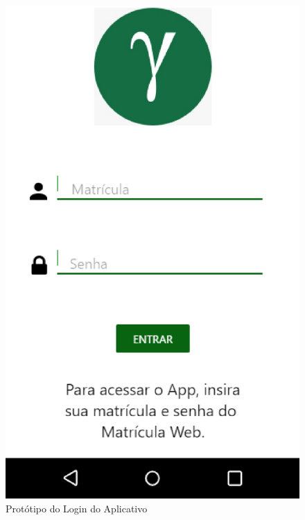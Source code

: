 \begin{figure}[!ht]
  \centering
  \includegraphics[keepaspectratio=true,scale=0.6]{figuras/prot-0.eps}
  \caption{Protótipo do Login do Aplicativo}
\end{figure}

